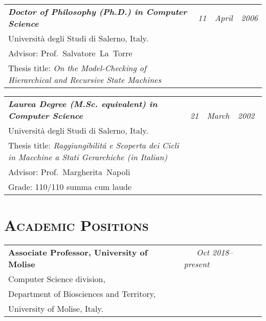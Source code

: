 \begin{resume}
\begin{tabular}{@{}p{4.8in}p{1.8in}}
\emph{\bf Doctor of Philosophy (Ph.D.) in Computer Science} &
 \emph{11~~April~~2006}\\
     Universit\`a degli Studi di Salerno, Italy.&~\\
 Advisor: Prof.~Salvatore~La~Torre &~\\
 Thesis title: \emph{On the Model-Checking of Hierarchical and Recursive State Machines}&~\\
\end{tabular}

\begin{tabular}{@{}p{4.6in}p{1.8in}}
\emph{\bf Laurea Degree (M.Sc. equivalent) in Computer Science} & \emph{\,\,\,\,\,\,\,21~~March~~2002}\\
 Universit\`a degli Studi di Salerno, Italy.&~\\
Thesis title: \emph{Raggiungibilit\'a e Scoperta dei Cicli in Macchine a Stati Gerarchiche (in Italian)}&~\\
Advisor: Prof.~Margherita~Napoli &~\\
Grade: 110/110 summa cum laude &~\\
\end{tabular}





\section{\bfseries \scshape  Academic Positions}


\begin{tabular}{@{}p{4.6in}p{1.8in}}
{\bf Associate Professor, University of Molise } & \emph{~~~Oct 2018--present}  \\
Computer Science division,\\
Department of Biosciences and Territory, \\
University of Molise, Italy.~\\
\end{tabular}


\end{resume}

